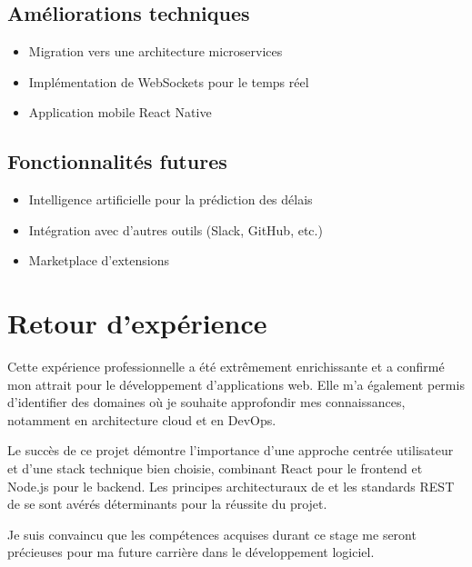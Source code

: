 \subsection{Améliorations techniques}
\begin{itemize}
	\item Migration vers une architecture microservices
	\item Implémentation de WebSockets pour le temps réel
	\item Application mobile React Native
\end{itemize}

\subsection{Fonctionnalités futures}
\begin{itemize}
	\item Intelligence artificielle pour la prédiction des délais
	\item Intégration avec d'autres outils (Slack, GitHub, etc.)
	\item Marketplace d'extensions
\end{itemize}

\section{Retour d'expérience}
Cette expérience professionnelle a été extrêmement enrichissante et a confirmé mon attrait pour le développement d'applications web. Elle m'a également permis d'identifier des domaines où je souhaite approfondir mes connaissances, notamment en architecture cloud et en DevOps.

Le succès de ce projet démontre l'importance d'une approche centrée utilisateur et d'une stack technique bien choisie, combinant React \cite{react2024} pour le frontend et Node.js \cite{nodejs2024} pour le backend. Les principes architecturaux de \cite{martin2017clean} et les standards REST de \cite{fielding2000rest} se sont avérés déterminants pour la réussite du projet.

Je suis convaincu que les compétences acquises durant ce stage me seront précieuses pour ma future carrière dans le développement logiciel.